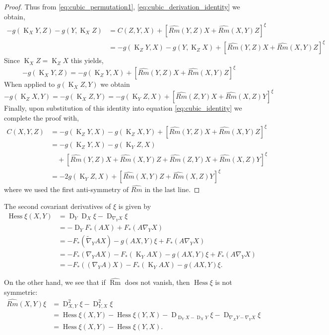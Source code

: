 \documentclass{amsart}
\theoremstyle{definition}
\theoremstyle{remark}
\DeclareMathOperator{\Rm}{Rm}
\DeclareMathOperator{\hess}{Hess}
\DeclareMathOperator{\diff}{K}
\DeclareMathOperator{\D}{D}
\numberwithin{equation}{section}
\begin{document}
\begin{proof}
Thus from \eqref{eq:cubic_permutation1}, \eqref{eq:cubic_derivation_identity} we obtain,
\begin{equation}
\label{eq:cubic_identity}
\begin{split} 
-g(\diff_X Y, Z) - g(Y, \diff_X Z) &= C(Z, Y, X) + \left[\widehat{Rm}(Y, Z) X + \widehat{Rm}(X, Y)Z\right]^\xi \\
&= -g(\diff_Z Y, X) - g(Y, \diff_Z X) + \left[\widehat{Rm}(Y, Z) X + \widehat{Rm}(X, Y)Z\right]^\xi
\end{split}
\end{equation}
Since $\diff_X Z = \diff_Z X$ this yields,
\[
-g(\diff_X Y, Z) = - g(\diff_Z Y, X) + \left[\widehat{Rm}(Y, Z) X + \widehat{Rm}(X, Y)Z\right]^\xi
\]
When applied to $g(\diff_X Z, Y)$ we obtain
\[
-g(\diff_Z X, Y) = - g(\diff_X Z, Y) = - g(\diff_Y Z, X) + \left[\widehat{Rm}(Z, Y) X + \widehat{Rm}(X, Z)Y\right]^\xi
\]
Finally, upon substitution of this identity into equation \eqref{eq:cubic_identity} we complete the proof with,
\begin{equation}
\begin{split}
C(X, Y, Z) &= -g(\diff_Z Y, X) - g(\diff_Z X, Y) + \left[\widehat{Rm}(Y, Z) X + \widehat{Rm}(X, Y)Z\right]^\xi \\
&= -g(\diff_Z Y, X) - g(\diff_Y Z, X) \\
&\quad + \left[\widehat{Rm}(Y, Z) X + \widehat{Rm}(X, Y)Z + \widehat{Rm}(Z, Y) X + \widehat{Rm}(X, Z)Y\right]^\xi \\
&= - 2g(\diff_Y Z, X) + \left[\widehat{Rm}(X, Y)Z + \widehat{Rm}(X, Z)Y\right]^{\xi}
\end{split}
\end{equation}
where we used the first anti-symmetry of $\widehat{Rm}$ in the last line.
\end{proof}

The second covariant derivatives of $ \xi$ is given by
\begin{align}
\hess\xi(X,Y)&=\D_Y\D_X\xi-\D_{\nabla_YX}\xi\\
&=-\D_YF_{\ast}(AX)+F_{\ast}(A\nabla_YX)\nonumber\\
&=-F_{\ast}(\tilde{\nabla}_{Y}AX)-g(A X,Y)\xi+F_{\ast}(A\nabla_YX)\nonumber\\
&=-F_{\ast}(\nabla_{Y}AX)-F_{\ast}(\diff_{Y}AX)-g(A X,Y)\xi+F_{\ast}(A\nabla_YX)\nonumber\\
&=-F_{\ast}((\nabla_Y A)X)-F_{\ast}(\diff_{Y}AX)-g(A X,Y)\xi.\nonumber
\end{align}

On the other hand, we see that if $\widehat{\Rm}$ does not vanish, then $\hess \xi$ is not symmetric:
\begin{align}
\widehat{Rm}(X,Y)\xi&=\D^2_{X,Y}\xi-\D^2_{Y,X}\xi\\
&=\hess\xi(X,Y)-\hess\xi(Y,X)-\D_{\D_YX-\D_XY}\xi-\D_{\nabla_XY-\nabla_YX}\xi\nonumber\\
&=\hess\xi(X,Y)-\hess\xi(Y,X).\nonumber
\end{align}
\end{document}
